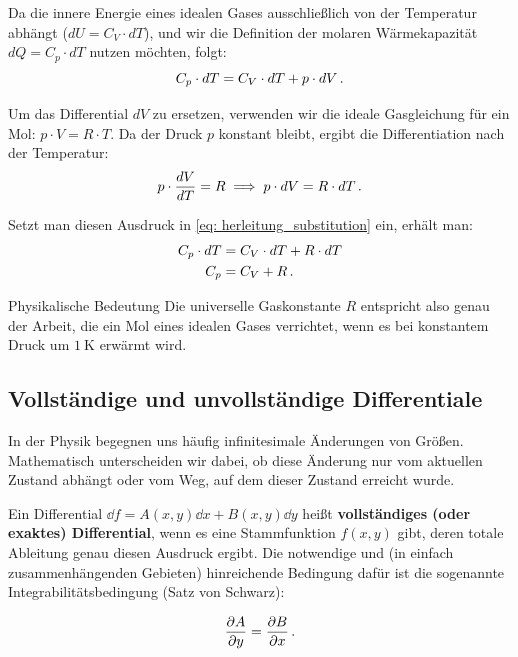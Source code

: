 Da die innere Energie eines idealen Gases ausschließlich von der Temperatur abhängt ($dU = C_V \cdot dT$), und wir die Definition der molaren Wärmekapazität $dQ = C_p \cdot dT$ nutzen möchten, folgt:
\begin{equation}\label{eq: herleitung_substitution}
    C_p \cdot dT = C_V \cdot dT + p \cdot dV \,.
\end{equation}

Um das Differential $dV$ zu ersetzen, verwenden wir die ideale Gasgleichung für ein Mol: $p \cdot V = R \cdot T$. Da der Druck $p$ konstant bleibt, ergibt die Differentiation nach der Temperatur:
\begin{equation}
    p \cdot \frac{dV}{dT} = R \implies p \cdot dV = R \cdot dT \,.
\end{equation}

Setzt man diesen Ausdruck in \cref{eq: herleitung_substitution} ein, erhält man:
\begin{align}
    C_p \cdot dT &= C_V \cdot dT + R \cdot dT \\
    C_p &= C_V + R \,.
\end{align}

\begin{rememberbox}{Physikalische Bedeutung}
    Die universelle Gaskonstante $R$ entspricht also genau der Arbeit, die ein Mol eines idealen Gases verrichtet, wenn es bei konstantem Druck um $\SI{1}{\kelvin}$ erwärmt wird.
\end{rememberbox}


\subsection{Vollständige und unvollständige Differentiale}\label{subsec: Differentiale_vollst_unvollst}

In der Physik begegnen uns häufig infinitesimale Änderungen von Größen. Mathematisch unterscheiden wir dabei, ob diese Änderung nur vom aktuellen Zustand abhängt oder vom Weg, auf dem dieser Zustand erreicht wurde.

Ein Differential $\dd f = A(x,y) \dd x + B(x,y) \dd y$ heißt \textbf{vollständiges (oder exaktes) Differential}, wenn es eine Stammfunktion $f(x,y)$ gibt, deren totale Ableitung genau diesen Ausdruck ergibt. Die notwendige und (in einfach zusammenhängenden Gebieten) hinreichende Bedingung dafür ist die sogenannte Integrabilitätsbedingung (Satz von Schwarz):

\begin{equation}\label{eq: Integrabilitätsbedingung}
    \frac{\partial A}{\partial y} = \frac{\partial B}{\partial x} \,.
\end{equation}

